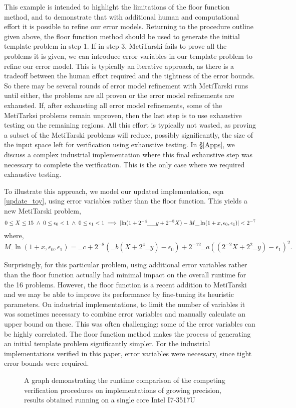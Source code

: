 \documentclass{fac}
\newcommand{\abs}[1]{\lvert#1\rvert}
\begin{document}
This example is intended to highlight the limitations of the floor function method, and to demonstrate that with additional human and computational effort it is possible to refine our error models. Returning to the procedure outline given above, the floor function method should be used to generate the initial template problem in step 1. If in step 3, MetiTarski fails to prove all the problems it is given, we can introduce error variables in our template problem to refine our error model. This is typically an iterative approach, as there is a tradeoff between the human effort required and the tightness of the error bounds. So there may be several rounds of error model refinement with MetiTarski runs until either, the problems are all proven or the error model refinements are exhausted. If, after exhausting all error model refinements, some of the MetiTarksi problems remain unproven, then the last step is to use exhaustive testing on the remaining regions. All this effort is typically not wasted, as proving a subset of the MetiTarski problems will reduce, possibly significantly, the size of the input space left for verification using exhaustive testing. In \S \ref{Apps}, we discuss a complex industrial implementation where this final exhaustive step was necessary to complete the verification. This is the only case where we required exhaustive testing.

To illustrate this approach, we model our updated implementation, eqn \ref{update_toy}, using error variables rather than the floor function. This yields a new MetiTarski problem,
\[
	0\le X \le 15 \hspace{0.1cm} \land \hspace{0.1cm} 0\le \epsilon_0<1\hspace{0.1cm} \land \hspace{0.1cm} 0\le \epsilon_1<1
	\implies \abs{\ln(1+2^{-4}\_\_y+2^{-8}X) - M\_\ln(1+x,\epsilon_0,\epsilon_1)} < 2^{-7}
\]
where, 
\[
M\_\ln(1+x,\epsilon_0,\epsilon_1)=\_\_c+2^{-8}(\_\_b(X+2^{4}\_\_y)-\epsilon_0)+2^{-12}\_\_a((2^{-2}X+2^{2}\_\_y)-\epsilon_1)^2.
\]

Surprisingly, for this particular problem, using additional error variables rather than the floor function actually had minimal impact on the overall runtime for the 16 problems. However, the floor function is a recent addition to MetiTarski and we may be able to improve its performance by fine-tuning its heuristic parameters. On industrial implementations, to limit the number of variables it was sometimes necessary to combine error variables and manually calculate an upper bound on these. This was often challenging: some of the error variables can be highly correlated. The floor function method makes the process of generating an initial template problem significantly simpler. For the industrial implementations verified in this paper, error variables were necessary, since tight error bounds were required.
\begin{figure}
\centering
\scalebox{0.9}{}
\caption{A graph demonstrating the runtime comparison of the competing verification procedures on implementations of growing precision, results obtained running on a single core Intel I7-3517U \label{runtime_graph}}
\end{figure}
\end{document}
